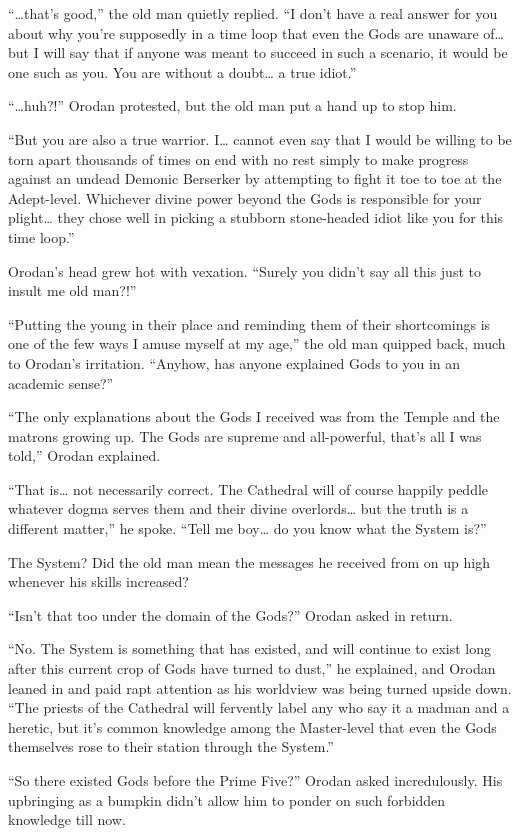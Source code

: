 \documentclass[a4paper,10pt]{book}
\begin{document}
“…that’s good,” the old man quietly replied. “I don’t have a real answer for you about why you’re supposedly in a time loop that even the Gods are unaware of… but I will say that if anyone was meant to succeed in such a scenario, it would be one such as you. You are without a doubt… a true idiot.”\par
“…huh?!” Orodan protested, but the old man put a hand up to stop him.\par
“But you are also a true warrior. I… cannot even say that I would be willing to be torn apart thousands of times on end with no rest simply to make progress against an undead Demonic Berserker by attempting to fight it toe to toe at the Adept-level. Whichever divine power beyond the Gods is responsible for your plight… they chose well in picking a stubborn stone-headed idiot like you for this time loop.”\par
Orodan’s head grew hot with vexation. “Surely you didn’t say all this just to insult me old man?!”\par
“Putting the young in their place and reminding them of their shortcomings is one of the few ways I amuse myself at my age,” the old man quipped back, much to Orodan’s irritation. “Anyhow, has anyone explained Gods to you in an academic sense?”\par
“The only explanations about the Gods I received was from the Temple and the matrons growing up. The Gods are supreme and all-powerful, that’s all I was told,” Orodan explained.\par
“That is… not necessarily correct. The Cathedral will of course happily peddle whatever dogma serves them and their divine overlords… but the truth is a different matter,” he spoke. “Tell me boy… do you know what the System is?”\par
The System? Did the old man mean the messages he received from on up high whenever his skills increased?\par
“Isn’t that too under the domain of the Gods?” Orodan asked in return.\par
“No. The System is something that has existed, and will continue to exist long after this current crop of Gods have turned to dust,” he explained, and Orodan leaned in and paid rapt attention as his worldview was being turned upside down. “The priests of the Cathedral will fervently label any who say it a madman and a heretic, but it’s common knowledge among the Master-level that even the Gods themselves rose to their station through the System.”\par
“So there existed Gods before the Prime Five?” Orodan asked incredulously. His upbringing as a bumpkin didn’t allow him to ponder on such forbidden knowledge till now.\par
\end{document}
